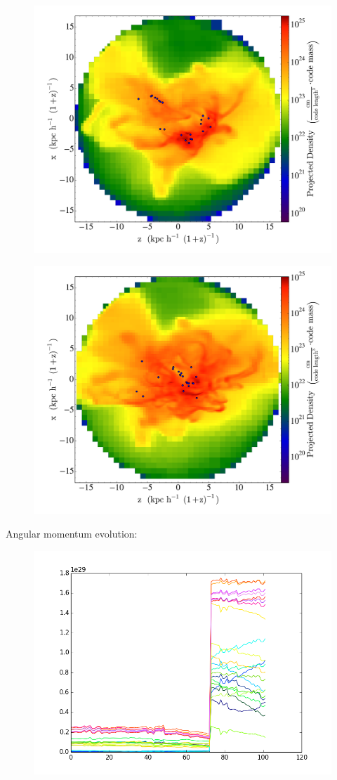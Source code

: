\documentclass[useAMS,usenatbib]{mn2e}
\begin{document}
\begin{figure}
  \centering
  \includegraphics[width=0.8\columnwidth]{P0224_y_D.png}
\end{figure}

\begin{figure}
  \centering
  \includegraphics[width=0.8\columnwidth]{P0274_y_D.png}
\end{figure}
Angular momentum evolution:

\begin{figure}
  \centering
  \includegraphics[width=0.8\columnwidth]{L2.png}
\end{figure}
\end{document}
